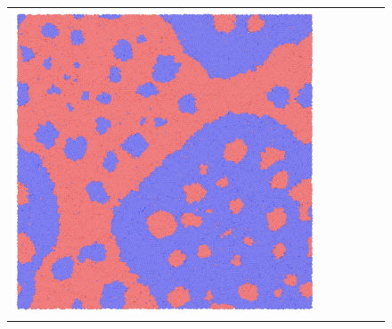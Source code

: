 \documentclass[12pt, reqno]{report}
\theoremstyle{definition}
\theoremstyle{remark}
\begin{document}
\begin{figure}[H]
\begin{tabular}{rccccc}
        \includegraphics[align = c, height=\subheight]{media_paper/phase1000.png} \\


\end{tabular}
\end{figure}
\end{document}
